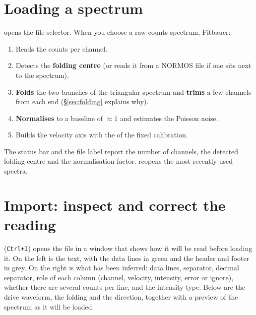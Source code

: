 \section{Loading a spectrum}

 opens the file selector. When you choose a raw-counts
spectrum, Fitbauer:

\begin{enumerate}[nosep]
  \item Reads the counts per channel.
  \item Detects the \textbf{folding centre} (or reads it from a NORMOS
         file if one sits next to the spectrum).
  \item \textbf{Folds} the two branches of the triangular spectrum and
        \textbf{trims} a few channels from each end (§\ref{sec:folding} explains why).
  \item \textbf{Normalises} to a baseline of $\approx 1$ and estimates the Poisson noise.
  \item Builds the velocity axis with the  of the fixed
        calibration.
\end{enumerate}


\begin{nota}
The status bar and the file label report the number of channels, the detected
folding centre and the normalisation factor. 
reopens the most recently used spectra.
\end{nota}

\section{Import: inspect and correct the reading}
\label{sec:importar}

 (\texttt{Ctrl+I}) opens the file in a window that shows
how it will be read before loading it. On the left is the text, with the data
lines in green and the header and footer in grey. On the right is what has been
inferred: data lines, separator, decimal separator, role of each column (channel,
velocity, intensity, error or ignore), whether there are several counts per line,
and the intensity type. Below are the drive waveform, the folding and the
direction, together with a preview of the spectrum as it will be loaded.

